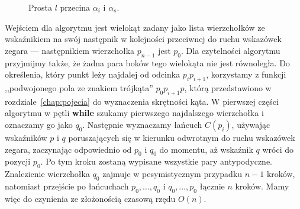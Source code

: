 \begin{figure}[tp]
  \caption{Prosta $l$ przecina $\alpha_i$ i $\alpha_s$.\label{fig:diameter}}
\end{figure}


Wejściem dla algorytmu jest wielokąt zadany jako lista wierzchołków ze
wskaźnikiem na swój następnik w kolejności przeciwnej do ruchu
wskazówek zegara --- następnikiem wierzchołka $p_{n-1}$ jest
$p_0$. Dla czytelności algorytmu przyjmijmy także, że żadna para boków
tego wielokąta nie jest równoległa. Do określenia, który punkt leży
najdalej od odcinka $p_{i}p_{i+1}$, korzystamy z funkcji ,,podwojonego
pola ze znakiem trójkąta'' $p_{0}p_{i+1}p$, którą przedstawiono w
rozdziale~\ref{chap:pojecia} do wyznaczenia skrętności kąta. W
pierwszej części algorytmu w pętli \textbf{while} szukamy pierwszego
najdalszego wierzchołka i oznaczamy go jako $q_0$. Następnie
wyznaczamy łańcuch $C(p_i)$, używając wskaźników $p$ i $q$
poruszających się w kierunku odwrotnym do ruchu wskazówek zegara,
zaczynając odpowiednio od $p_0$ i $q_0$ do momentu, aż wskaźnik $q$
wróci do pozycji $p_0$. Po tym kroku zostaną wypisane wszystkie pary
antypodyczne. Znalezienie wierzchołka $q_0$ zajmuje w pesymistycznym
przypadku $n-1$ kroków, natomiast przejście po łańcuchach $p_{0},
\ldots, q_{0}$ i $q_{0}, \ldots, p_{0}$ łącznie $n$ kroków. Mamy więc
do czynienia ze złożonością czasową rzędu $O(n)$.


